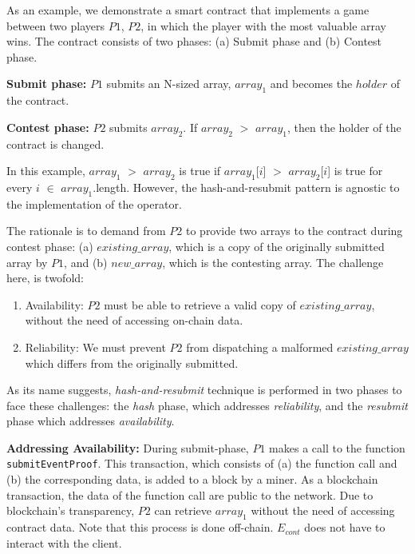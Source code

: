 

As an example, we demonstrate a smart contract that implements a game between
two players $P1$, $P2$, in which the player with the most valuable array wins.
The contract consists of two phases: (a) Submit phase and (b) Contest phase.

\noindent \textbf{Submit
phase:} $P1$ submits an N-sized array, $array_1$ and becomes the
$holder$ of the contract.

\noindent \textbf{Contest phase:} $P2$ submits $array_2$. If $array_2$ $>$
$array_1$, then the holder of the contract is changed.

In this example, $array_1$ $>$ $array_2$ is true if $array_1$[$i$] $>$
$array_2$[$i$] is true for every $i$ $\in$ $array_1$.length. However, the
hash-and-resubmit pattern is agnostic to the implementation of the operator.

The rationale is to demand from $P2$ to provide two arrays to the contract
during contest phase: (a) $existing\_{array}$, which is a copy of the
originally submitted array by $P1$, and (b) $new\_array$, which is the
contesting array. The challenge here, is twofold:

\begin{enumerate}

    \item Availability: $P2$ must be able to retrieve a valid copy of
        $existing\_array$, without the need of accessing on-chain data.

    \item Reliability: We must prevent $P2$ from dispatching a malformed
        $existing\_array$ which differs from the originally submitted.

\end{enumerate}

As its name suggests, \emph{hash-and-resubmit} technique is performed in two
phases to face these challenges: the \emph{hash} phase, which addresses
\emph{reliability}, and the \emph{resubmit} phase which addresses
\emph{availability}.

\noindent

\textbf{Addressing Availability:} During submit-phase, $P1$ makes a call to the
function \texttt{submitEventProof}. This transaction, which consists of (a) the
function call and (b) the corresponding data, is added to a block by a miner.
As a blockchain transaction, the data of the function call are public to the
network. Due to blockchain's transparency, $P2$ can retrieve $array_1$ without
the need of accessing contract data. Note that this process is done off-chain.
$E_{cont}$ does not have to interact with the client.

